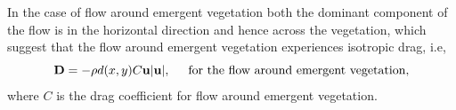 \documentclass[12pt]{report}   %
\newcommand{\bn}{{\boldsymbol{\hat{n}}}}
\newcommand{\bt}{{\boldsymbol{\hat{t}}}}
\newcommand{\bu}{\mathbf{u}}
\newcommand{\monami}{\textit{monami}}
\begin{document}
In the case of flow around emergent vegetation both the dominant component of the flow is in the horizontal direction and hence across the vegetation, which suggest that the flow around emergent vegetation experiences isotropic drag, i.e,
\begin{equation}
 \mathbf{D} = -\rho d(x,y) C \bu |\bu| , \hspace{.5cm} \text{for the flow around emergent vegetation,}
\end{equation}
where $C$ is the drag coefficient for flow around emergent vegetation.
\end{document}
